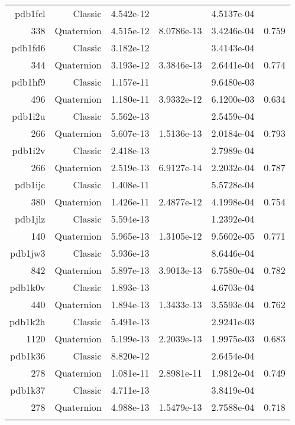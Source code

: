 \begin{xltabular}{\textwidth}{r|rS[table-format=1.3e+2]S[table-format=1.4e+2]S[table-format=1.4e+2]S[table-format=-1.3]}
pdb1fcl & Classic & 4.542e-12 &  & 4.5137e-04 & \\
338 & Quaternion & 4.515e-12 & 8.0786e-13 & 3.4246e-04 & 0.759\\  \addlinespace
pdb1fd6 & Classic & 3.182e-12 &  & 3.4143e-04 & \\
344 & Quaternion & 3.193e-12 & 3.3846e-13 & 2.6441e-04 & 0.774\\  \addlinespace
{\color{red} pdb1hf9 } & Classic & 1.157e-11 &  & 9.6480e-03 & \\
496 & Quaternion & 1.180e-11 & 3.9332e-12 & 6.1200e-03 & 0.634\\  \addlinespace
pdb1i2u & Classic & 5.562e-13 &  & 2.5459e-04 & \\
266 & Quaternion & 5.607e-13 & 1.5136e-13 & 2.0184e-04 & 0.793\\  \addlinespace
pdb1i2v & Classic & 2.418e-13 &  & 2.7989e-04 & \\
266 & Quaternion & 2.519e-13 & 6.9127e-14 & 2.2032e-04 & 0.787\\  \addlinespace
pdb1ijc & Classic & 1.408e-11 &  & 5.5728e-04 & \\
380 & Quaternion & 1.426e-11 & 2.4877e-12 & 4.1998e-04 & 0.754\\  \addlinespace
pdb1jlz & Classic & 5.594e-13 &  & 1.2392e-04 & \\
140 & Quaternion & 5.965e-13 & 1.3105e-12 & 9.5602e-05 & 0.771\\  \addlinespace
pdb1jw3 & Classic & 5.936e-13 &  & 8.6446e-04 & \\
842 & Quaternion & 5.897e-13 & 3.9013e-13 & 6.7580e-04 & 0.782\\  \addlinespace
pdb1k0v & Classic & 1.893e-13 &  & 4.6703e-04 & \\
440 & Quaternion & 1.894e-13 & 1.3433e-13 & 3.5593e-04 & 0.762\\  \addlinespace
{\color{red} pdb1k2h } & Classic & 5.491e-13 &  & 2.9241e-03 & \\
1120 & Quaternion & 5.199e-13 & 2.2039e-13 & 1.9975e-03 & 0.683\\  \addlinespace
pdb1k36 & Classic & 8.820e-12 &  & 2.6454e-04 & \\
278 & Quaternion & 1.081e-11 & 2.8981e-11 & 1.9812e-04 & 0.749\\  \addlinespace
pdb1k37 & Classic & 4.711e-13 &  & 3.8419e-04 & \\
278 & Quaternion & 4.988e-13 & 1.5479e-13 & 2.7588e-04 & 0.718\\  \addlinespace

\end{xltabular}
